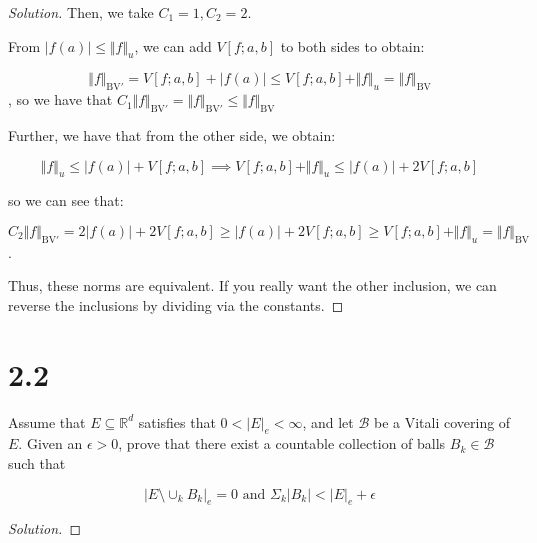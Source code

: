 \documentclass[10pt]{article}
\newcommand{\bv}{{\text{BV}}}
\newenvironment{problem}[2][Problem]{\begin{trivlist}
\item[\hskip \labelsep {\bfseries #1}\hskip \labelsep {\bfseries #2.}]}{\end{trivlist}}
\begin{document}
\begin{proof}[Solution]
Then, we take $C_1 = 1, C_2 = 2$. 

From $|f(a)| \leq \Vert f \Vert_u$, we can add $V[f;a,b]$ to both sides to obtain:

$$ \Vert f \Vert_{\bv'} =  V[f;a,b] + |f(a)| \leq V[f;a,b] +   \Vert f \Vert_u  =  \Vert f \Vert_{\bv}$$, so we have that $C_1 \Vert f \Vert_{\bv'} = \Vert f \Vert_{\bv'} \leq \Vert f \Vert_{\bv}$

Further, we have that from the other side, we obtain:

$$ \Vert f \Vert_u \leq |f(a)| + V[f;a,b] \implies  V[f;a,b] + \Vert f \Vert_u \leq |f(a)| + 2V[f;a,b] $$

so we can see that:

$$C_2 \Vert f \Vert_{\bv'} =  2|f(a)| + 2V[f;a,b] \geq  |f(a)| + 2V[f;a,b] \geq  V[f;a,b] + \Vert f \Vert_u = \Vert f \Vert_{\bv} $$.

Thus, these norms are equivalent. If you really want the other inclusion, we can reverse the inclusions by dividing via the constants.
\end{proof}

\section*{2.2}



\begin{problem}{5.3.5}
Assume that $E \subseteq \mathbb{R}^d$ satisfies that $0 < |E|_e < \infty$, and let $\mathcal{B}$ be a Vitali covering of $E$. Given an $\epsilon > 0$, prove that there exist a countable collection of balls $B_k \in \mathcal{B}$ such that

$$\left| E \setminus \cup_k B_k \right|_e = 0 \text{ and } \Sigma_k |B_k| < |E|_e + \epsilon $$

\end{problem}
\begin{proof}[Solution]


\end{proof}

 
\end{document}
